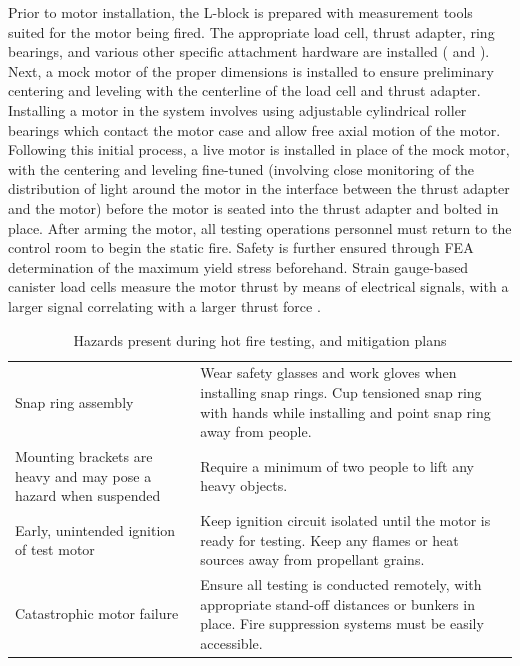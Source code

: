 Prior to motor installation, the L-block is prepared with measurement tools suited for the motor being fired. The appropriate load cell, thrust adapter, ring bearings, and various other specific attachment hardware are installed ( and ). Next, a mock motor of the proper dimensions is installed to ensure preliminary centering and leveling with the centerline of the load cell and thrust adapter. Installing a motor in the system involves using adjustable cylindrical roller bearings which contact the motor case and allow free axial motion of the motor. Following this initial process, a live motor is installed in place of the mock motor, with the centering and leveling fine-tuned (involving close monitoring of the distribution of light around the motor in the interface between the thrust adapter and the motor) before the motor is seated into the thrust adapter and bolted in place. After arming the motor, all testing operations personnel must return to the control room to begin the static fire. Safety is further ensured through FEA determination of the maximum yield stress beforehand. Strain gauge-based canister load cells measure the motor thrust by means of electrical signals, with a larger signal correlating with a larger thrust force \cite{uah-thesis}.

\begin{table}[p]
    \centering

    \begin{longtable}{|>{\raggedright\arraybackslash}p{5.75cm}|>{\raggedright\arraybackslash}p{8.75cm}|}
        \hline
        \multicolumn{1}{|c|}{\textbf{Hazard}} & \multicolumn{1}{c|}{\textbf{Mitigation}} \\ \hline
        Snap ring assembly & Wear safety glasses and work gloves when installing snap rings. Cup tensioned snap ring with hands while installing and point snap ring away from people. \\ \hline
        Mounting brackets are heavy and may pose a hazard when suspended & Require a minimum of two people to lift any heavy objects. \\ \hline
        Early, unintended ignition of test motor & Keep ignition circuit isolated until the motor is ready for testing. Keep any flames or heat sources away from propellant grains. \\ \hline
        Catastrophic motor failure & Ensure all testing is conducted remotely, with appropriate stand-off distances or bunkers in place. Fire suppression systems must be easily accessible. \\ \hline
    \end{longtable}

    \vspace{0.2cm}
    
    \caption{Hazards present during hot fire testing, and mitigation plans}
    \label{table:hotfire-hazards}
\end{table}

